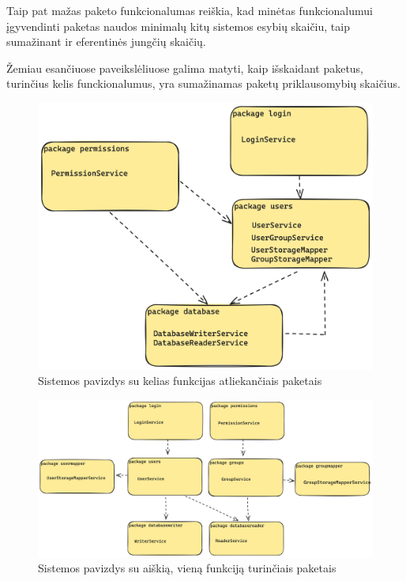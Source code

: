 Taip pat mažas paketo funkcionalumas reiškia, kad minėtas funkcionalumui įgyvendinti paketas naudos minimalų kitų sistemos esybių skaičiu,
taip sumažinant ir eferentinės jungčių skaičių.

Žemiau esančiuose paveikslėliuose galima matyti, kaip išskaidant paketus, turinčius kelis funckionalumus, yra sumažinamas paketų
priklausomybių skaičius.
\begin{figure}[H]
    \centering
    \includegraphics[scale=0.15]{img/excesive_deps}
    \caption{Sistemos pavizdys su kelias funkcijas atliekančiais paketais}
    \label{img:excesive_deps}
\end{figure}


\begin{figure}[H]
    \centering
    \includegraphics[scale=0.13]{img/good_deps}
    \caption{Sistemos pavizdys su aiškią, vieną funkciją turinčiais paketais}
    \label{img:good_deps}
\end{figure}


